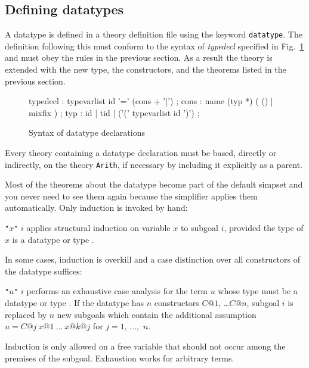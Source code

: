 \subsection{Defining datatypes}

A datatype is defined in a theory definition file using the keyword
{\tt datatype}.  The definition following this must conform to the
syntax of {\em typedecl} specified in Fig.~\ref{datatype-grammar} and
must obey the rules in the previous section.  As a result the theory is
extended with the new type, the constructors, and the theorems listed
in the previous section.

\begin{figure}
\begin{rail}
typedecl : typevarlist id '=' (cons + '|')
         ;
cons     : name (typ *) ( () | mixfix )
         ;
typ      : id | tid | ('(' typevarlist id ')')
         ;
\end{rail}
\caption{Syntax of datatype declarations}
\label{datatype-grammar}
\end{figure}

\begin{warn}
  Every theory containing a datatype declaration must be based, directly or
  indirectly, on the theory \texttt{Arith}, if necessary by including it
  explicitly as a parent.
\end{warn}

Most of the theorems about the datatype become part of the default simpset
and you never need to see them again because the simplifier applies them
automatically.  Only induction is invoked by hand:
\begin{ttdescription}
\item[\ttindexbold{induct_tac} {\tt"}$x${\tt"} $i$]
 applies structural induction on variable $x$ to subgoal $i$, provided the
 type of $x$ is a datatype or type .
\end{ttdescription}
In some cases, induction is overkill and a case distinction over all
constructors of the datatype suffices:
\begin{ttdescription}
\item[\ttindexbold{exhaust_tac} {\tt"}$u${\tt"} $i$]
 performs an exhaustive case analysis for the term $u$ whose type
 must be a datatype or type .  If the datatype has $n$ constructors
 $C@1$, \dots $C@n$, subgoal $i$ is replaced by $n$ new subgoals which
 contain the additional assumption $u = C@j~x@1~\dots~x@{k@j}$ for
 $j=1$, $\dots$,~$n$.
\end{ttdescription}
\begin{warn}
  Induction is only allowed on a free variable that should not occur among
  the premises of the subgoal.  Exhaustion works for arbitrary terms.
\end{warn}
\bigskip


